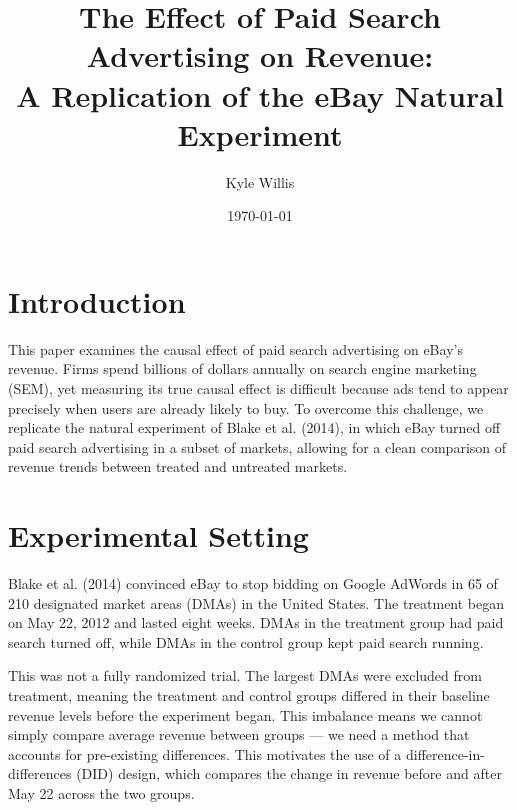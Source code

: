 \documentclass[12pt]{article}
\title{The Effect of Paid Search Advertising on Revenue: \\
A Replication of the eBay Natural Experiment}
\author{Kyle Willis}
\date{\today}
\begin{document}
\maketitle

\section{Introduction}
This paper examines the causal effect of paid search advertising on eBay's revenue. Firms spend billions of dollars annually on search engine marketing (SEM), yet measuring its true causal effect is difficult because ads tend to appear precisely when users are already likely to buy. To overcome this challenge, we replicate the natural experiment of Blake et al. (2014), in which eBay turned off paid search advertising in a subset of markets, allowing for a clean comparison of revenue trends between treated and untreated markets.

\section{Experimental Setting}
Blake et al. (2014) convinced eBay to stop bidding on Google AdWords in 65 of 210 designated market areas (DMAs) in the United States. The treatment began on May 22, 2012 and lasted eight weeks. DMAs in the treatment group had paid search turned off, while DMAs in the control group kept paid search running.

This was not a fully randomized trial. The largest DMAs were excluded from treatment, meaning the treatment and control groups differed in their baseline revenue levels before the experiment began. This imbalance means we cannot simply compare average revenue between groups — we need a method that accounts for pre-existing differences. This motivates the use of a difference-in-differences (DID) design, which compares the change in revenue before and after May 22 across the two groups.
\end{document}
